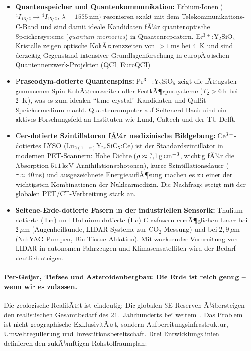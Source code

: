 ﻿\documentclass[12pt, a4paper]{report}
\theoremstyle{definition}
\theoremstyle{remark}
\begin{document}
\begin{itemize}
  \item \textbf{Quantenspeicher und Quantenkommunikation:}
    Erbium-Ionen ($^4I_{13/2} \to {^4I_{15/2}}$, $\lambda = 1535\,\text{nm}$)
    resonieren exakt mit dem Telekommunikations-C-Band und sind damit ideale
    Kandidaten fÃ¼r quantenoptische Speichersysteme (\emph{quantum memories})
    in Quantenrepeatern. Er$^{3+}$:Y$_2$SiO$_5$-Kristalle zeigen optische
    KohÃ¤renzzeiten von $>1\,\text{ms}$ bei 4~K und sind derzeitig Gegenstand
    intensiver Grundlagenforschung in europÃ¤ischen Quantennetzwerk-Projekten
    (QCI, EuroQCI).

  \item \textbf{Praseodym-dotierte Quantenspins:}
    Pr$^{3+}$:Y$_2$SiO$_5$ zeigt die lÃ¤ngsten gemessenen Spin-KohÃ¤renzzeiten
    aller FestkÃ¶rpersysteme ($T_2 > 6\,\text{h}$ bei 2~K), was es zum
    idealen ``time crystal''-Kandidaten und $\mathrm{QuBit}$-Speichermedium
    macht. Quantencomputer auf Seltenerd-Basis sind ein aktives Forschungsfeld
    an Instituten wie Lund, Caltech und der TU Delft.

  \item \textbf{Cer-dotierte Szintillatoren fÃ¼r medizinische Bildgebung:}
    Ce$^{3+}$-dotiertes LYSO (Lu$_{2(1-x)}$Y$_{2x}$SiO$_5$:Ce) ist der
    Standardszintillator in modernen PET-Scannern: Hohe Dichte
    ($\rho \approx 7{,}1\,\text{g\,cm}^{-3}$, wichtig fÃ¼r die Absorption
    $511\,\text{keV}$-Annihilationsphotonen), kurze Szintillationsdauer
    ($\tau \approx 40\,\text{ns}$) und ausgezeichnete EnergieauflÃ¶sung machen
    es zu einer der wichtigsten Kombinationen der Nuklearmedizin. Die Nachfrage
    steigt mit der globalen PET/CT-Verbreitung stark an.

  \item \textbf{Seltene-Erde-dotierte Fasern in der industriellen Sensorik:}
    Thulium-dotierte (Tm) und Holmium-dotierte (Ho) Glasfasern ermÃ¶glichen
    Laser bei $2\,\mu\text{m}$ (Augenheilkunde, LIDAR-Systeme zur
    CO$_2$-Messung) und bei $2{,}9\,\mu\text{m}$ (Nd:YAG-Pumpen,
    Bio-Tissue-Ablation). Mit wachsender Verbreitung von LIDAR in
    autonomen Fahrzeugen und Klimasensatelliten wird der Bedarf deutlich
    steigen.
\end{itemize}

\paragraph{Per-Geijer, Tiefsee und Asteroidenbergbau: Die Erde ist
reich genug -- wenn wir es zulassen.}
Die geologische RealitÃ¤t ist eindeutig: Die globalen SE-Reserven Ã¼bersteigen
den realistischen Gesamtbedarf des 21.~Jahrhunderts bei weitem~\cite{usgs2024}.
Das Problem ist nicht geographische ExklusivitÃ¤t, sondern Aufbereitungsinfrastruktur,
Umweltregulierung und Investitionsbereitschaft. Drei Entwicklungslinien
definieren den zukÃ¼nftigen Rohstoffraumplan:
\end{document}
